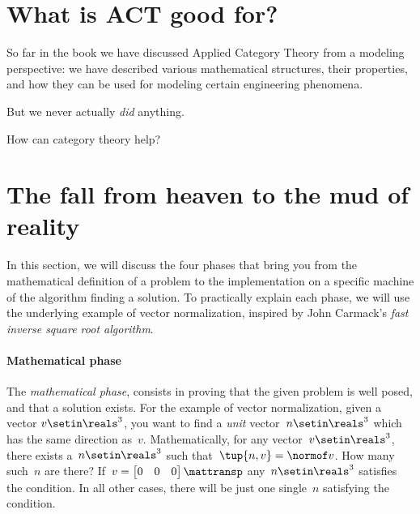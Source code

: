 
\section{What is ACT good for?}

So far in the book we have discussed Applied Category Theory from a modeling perspective: we have described various mathematical structures, their properties, and how they can be used for modeling certain engineering phenomena.

But we never actually \emph{did} anything.

How can category theory help?


\section{The fall from heaven to the mud of reality}
\publictodomessage
In this section, we will discuss the four phases that bring you from the mathematical definition of a problem to the implementation on a specific machine of the algorithm finding a solution.
To practically explain each phase, we will use the underlying example of vector normalization, inspired by John Carmack's \emph{fast inverse square root algorithm}.


\paragraph*{Mathematical phase}
The \emph{mathematical phase}, consists in proving that the given problem is well posed, and that a solution exists.
For the example of vector normalization, given a vector $v\setin \reals^3$, you want to find a \emph{unit} vector~$n\setin \reals^3$ which has the same direction as~$v$.
Mathematically, for any vector~$v\setin \reals^3$, there exists a~$n\setin \reals^3$ such that~$\tup{n,v}=\normof v $.
How many such~$n$ are there?
If~$v=\begin{bmatrix}
        0 & 0 & 0
    \end{bmatrix}\mattransp$ any~$n\setin \reals^3$ satisfies the condition.
In all other cases, there will be just one single~$n$ satisfying the condition.

